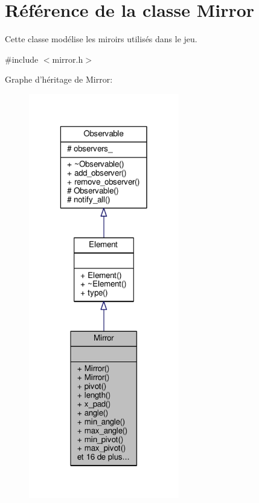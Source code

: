 \hypertarget{classMirror}{\section{Référence de la classe Mirror}
\label{classMirror}
}


Cette classe modélise les miroirs utilisés dans le jeu.  




{\ttfamily \#include $<$mirror.\+h$>$}



Graphe d'héritage de Mirror\+:\nopagebreak
\begin{figure}[H]
\begin{center}
\leavevmode
\includegraphics[width=186pt]{d8/d7d/classMirror__inherit__graph}
\end{center}
\end{figure}


